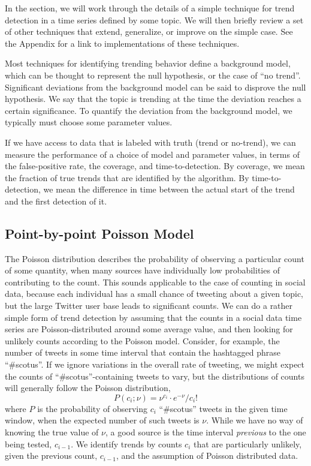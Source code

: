 \documentclass{article}
\begin{document}
In the section, we will work through the details of a simple technique for
trend detection in a time series defined by some topic. We will then briefly
review a set of other techniques that extend, generalize, or improve on the
simple case. See the Appendix for a link to implementations of these
techniques.

Most techniques for identifying trending behavior define a background model,
which can be thought to represent the null hypothesis, or the case of “no
trend”. Significant deviations from the background model can be said to
disprove the null hypothesis. We say that the topic is trending at the time the
deviation reaches a certain significance. To quantify the deviation from the
background model, we typically must choose some parameter values. 

If we have access to data that is labeled with truth (trend or no-trend), we
can measure the performance of a choice of model and parameter values, in terms
of the false-positive rate, the coverage, and time-to-detection. By coverage,
we mean the fraction of true trends that are identified by the algorithm. By
time-to-detection, we mean the difference in time between the actual start of
the trend and the first detection of it.

\subsection{Point-by-point Poisson Model}
\label{pbppm}

The Poisson distribution describes the probability of observing a particular
count of some quantity, when many sources have individually low probabilities
of contributing to the count. This sounds applicable to the case of counting in
social data, because each individual has a small chance of tweeting about a
given topic, but the large Twitter user base leads to significant counts. We
can do a rather simple form of trend detection by assuming that the counts in a
social data time series are Poisson-distributed around some average value, and
then looking for unlikely counts according to the Poisson model. Consider, for example,
the number of tweets in some time interval that contain the hashtagged phrase ``\#scotus''.
If we ignore variations in the overall rate of tweeting, we might expect the
counts of ``\#scotus''-containing tweets to vary, but the distributions of counts
will generally follow the Poisson distribution,
\begin{equation}
    P(c_i;\nu) = \nu^{c_i}\cdot e^{-\nu} / c_i!
\end{equation}
where $P$ is the probability of observing $c_i$ ``\#scotus'' tweets in the given time
window, when the expected number of such tweets is $\nu$. While we have no way of
knowing the true value of $\nu$, a good source is the time interval \textit{previous} to the
one being tested, $c_{i-1}$. We identify trends by counts $c_i$ that are particularly
unlikely, given the previous count, $c_{i-1}$, and the assumption of Poisson
distributed data. 
\end{document}
